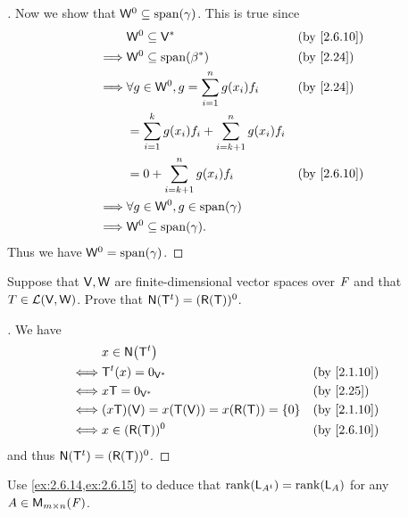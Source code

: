\begin{proof}[]
  Now we show that \(\W^0 \subseteq \spn{\gamma}\).
  This is true since
  \begin{align*}
             & \W^0 \subseteq \V^*                                         &  & \by{2.6.10} \\
    \implies & \W^0 \subseteq \spn{\beta^*}                                &  & \by{2.24}   \\
    \implies & \forall g \in \W^0, g = \sum_{i = 1}^n g(x_i) f_i           &  & \by{2.24}   \\
             & = \sum_{i = 1}^k g(x_i) f_i + \sum_{i = k + 1}^n g(x_i) f_i                  \\
             & = 0 + \sum_{i = k + 1}^n g(x_i) f_i                         &  & \by{2.6.10} \\
    \implies & \forall g \in \W^0, g \in \spn{\gamma}                                       \\
    \implies & \W^0 \subseteq \spn{\gamma}.
  \end{align*}
  Thus we have \(\W^0 = \spn{\gamma}\).
\end{proof}

\begin{ex}\label{ex:2.6.15}
  Suppose that \(\mathsf{V}, \mathsf{W}\) are finite-dimensional vector spaces over \(\mathit{F}\) and that \(T \in \mathcal{L}(\mathsf{V}, \mathsf{W})\).
  Prove that \(\ns{\tp{\T}} = (\rg{\T})^0\).
\end{ex}

\begin{proof}[]
  We have
  \begin{align*}
         & x \in \ns{\tp{\T}}                                             \\
    \iff & \tp{\T}(x) = 0_{\V^*}                         &  & \by{2.1.10} \\
    \iff & x \T = 0_{\V^*}                               &  & \by{2.25}   \\
    \iff & (x \T)(\V) = x(\T(\V)) = x(\rg{\T}) = \set{0} &  & \by{2.1.10} \\
    \iff & x \in (\rg{\T})^0                             &  & \by{2.6.10}
  \end{align*}
  and thus \(\ns{\tp{\T}} = (\rg{\T})^0\).
\end{proof}

\begin{ex}\label{ex:2.6.16}
  Use \cref{ex:2.6.14,ex:2.6.15} to deduce that \(\rk{\L_{\tp{A}}} = \rk{\L_A}\) for any \(A \in \ms\).
\end{ex}

